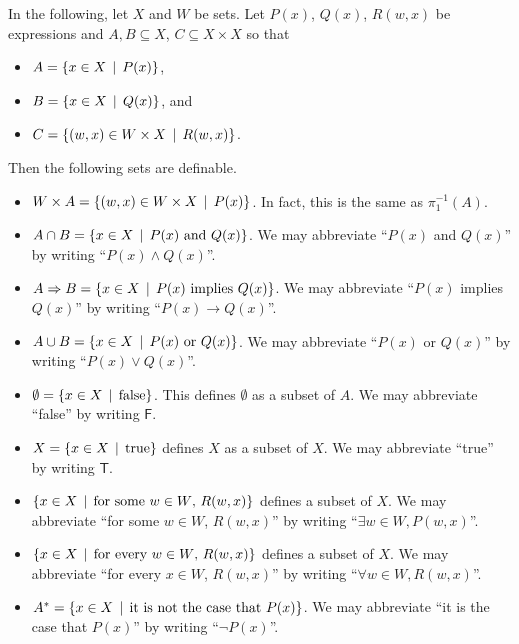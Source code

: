 \begin{vocabulary}
	In the following, let $X$ and $W$ be sets. Let $P(x)$, $Q(x)$, $R(w,x)$ be expressions and $A,B\subseteq X$, $C\subseteq X\times X$ so that
	\begin{itemize}
		\item $A = \{x\in X\,\mid\, P(x)\}$,
		\item $B = \{x\in X\,\mid\, Q(x)\}$, and
		\item $C = \{(w,x)\in W\times X\,\mid\, R(w,x)\}$.
	\end{itemize}
	Then the following sets are definable. 
	\begin{itemize}
		\item $W\times A = \{(w,x)\in W\times X\,\mid\, P(x)\}$. In fact, this is the same 
		as $\pi_1^{-1}(A)$.  
		
		\item $A\cap B = \{x\in X\,\mid\, \text{$P(x)$ and $Q(x)$}\}$. We may abbreviate ``$P(x)$ and $Q(x)$'' by writing ``$P(x)\wedge Q(x)$''. 
		
		\item $A\Rightarrow B = \{x\in X\,\mid\, \text{$P(x)$ implies $Q(x)$}\}$. We may abbreviate ``$P(x)$ implies $Q(x)$'' by writing ``$P(x)\to Q(x)$''.
		
		\item $A\cup B = \{x\in X\,\mid\, \text{$P(x)$ or $Q(x)$}\}$. We may abbreviate ``$P(x)$ or $Q(x)$'' by writing ``$P(x)\vee Q(x)$''.
		
		\item $\emptyset = \{x\in X\,\mid\, \text{false} \}$. This defines $\emptyset$ as a subset of $A$. We may abbreviate ``false'' by writing $\textsf{F}$.
		
		\item $X = \{x\in X\,\mid\, \text{true}\}$ defines $X$ as a subset of $X$. We may abbreviate ``true'' by writing $\textsf{T}$.
		
		\item $\{x\in X \,\mid\, \text{for some $w\in W$, $R(w,x)$}\}$ defines a subset of $X$. We may abbreviate ``for some $w\in W$, $R(w,x)$'' by writing ``$\exists w\in W, P(w,x)$''.
		
		\item $\{x\in X \,\mid\, \text{for every $w\in W$, $R(w,x)$}\}$ defines a subset of $X$.  We may abbreviate ``for every $x\in W$, $R(w,x)$'' by writing ``$\forall w\in W, R(w,x)$''.
		
		\item $A^* = \{x\in X\,\mid\, \text{it is not the case that $P(x)$}\}$.  We may abbreviate ``it is the case that $P(x)$'' by writing ``$\neg P(x)$''.
	\end{itemize}
\end{vocabulary}

